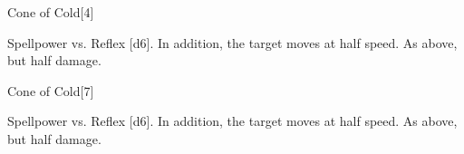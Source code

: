 \begin{spellsection}{Cone of Cold}[4]
    \begin{spellheader}
    \end{spellheader}
    \begin{spellcontent}
        \begin{spelltargetinginfo}
        \end{spelltargetinginfo}
        \begin{spelleffects}
            \begin{spellattack}{Spellpower vs. Reflex}
                \spellsuccess {}[d6]. In addition, the target moves at half speed.
                \spellfailure As above, but half damage.
            \end{spellattack}
            \spelldur \durshort
        \end{spelleffects}
    \end{spellcontent}
    \begin{spellfooter}
        \miscastexplode
    \end{spellfooter}
\end{spellsection}

\begin{spellsection}[Greater]{Cone of Cold}[7]
    \begin{spellheader}
    \end{spellheader}
    \begin{spellcontent}
        \begin{spelltargetinginfo}
        \end{spelltargetinginfo}
        \begin{spelleffects}
            \begin{spellattack}{Spellpower vs. Reflex}
                \spellsuccess {}[d6]. In addition, the target moves at half speed.
                \spellfailure As above, but half damage.
            \end{spellattack}
        \end{spelleffects}
    \end{spellcontent}
    \begin{spellfooter}
        \miscastexplode
    \end{spellfooter}
\end{spellsection}

